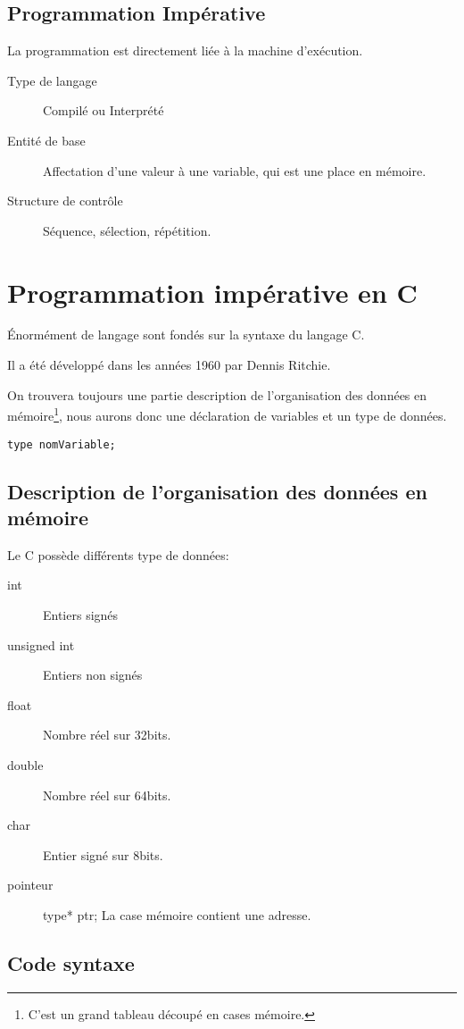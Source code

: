 \documentclass[12pt,a4paper,openany]{article}
\begin{document}
		\subsection{Programmation Impérative}
			La programmation est directement liée à la machine d'exécution.
			\begin{description}	
				\item[Type de langage] Compilé ou Interprété
				\item[Entité de base] Affectation d'une valeur à une variable, qui est une place en mémoire.
				\item[Structure de contrôle] Séquence, sélection, répétition.
			\end{description}

	\section{Programmation impérative en C}
	Énormément de langage sont fondés sur la syntaxe du langage C.

	Il a été développé dans les années 1960 par Dennis Ritchie. 

	On trouvera toujours une partie description de l'organisation des données en mémoire\footnote{C'est un grand tableau découpé en cases mémoire.},
	nous aurons donc une déclaration de variables et un type de données.
	\begin{lstlisting}[caption=Syntaxe de déclaration de variable]
type nomVariable;		
	\end{lstlisting}
	\subsection{Description de l'organisation des données en mémoire}\label{types}
	Le C possède différents type de données: 
	\begin{description}
		\item[int] Entiers signés
		\item[unsigned int] Entiers non signés 
		\item[float] Nombre réel sur 32bits. 
		\item[double] Nombre réel sur 64bits.
		\item[char] Entier signé sur 8bits.
		\item[pointeur] type* ptr; La case mémoire contient une adresse.
	\end{description}
	\subsection{Code syntaxe}
\end{document}
